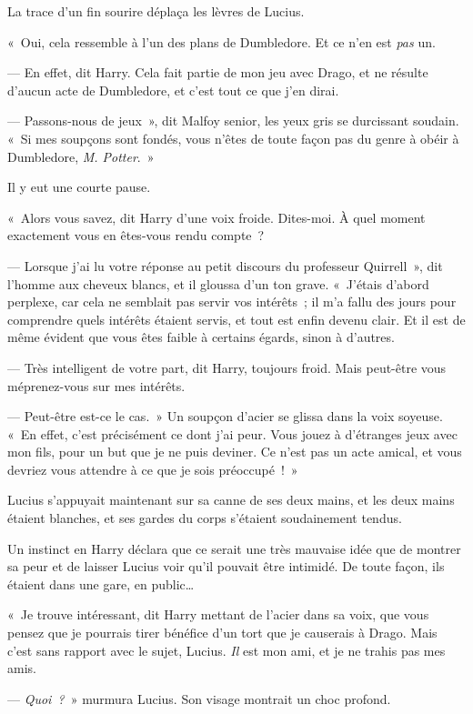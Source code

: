 La trace d'un fin sourire déplaça les lèvres de Lucius.

«~Oui, cela ressemble à l'un des plans de Dumbledore. Et ce n'en est \emph{pas} un.

--- En effet, dit Harry. Cela fait partie de mon jeu avec Drago, et ne résulte d'aucun acte de Dumbledore, et c'est tout ce que j'en dirai.

--- Passons-nous de jeux~», dit Malfoy senior, les yeux gris se durcissant soudain. «~Si mes soupçons sont fondés, vous n'êtes de toute façon pas du genre à obéir à Dumbledore, \emph{M. Potter}.~»

Il y eut une courte pause.

«~Alors vous savez, dit Harry d'une voix froide. Dites-moi. À quel moment exactement vous en êtes-vous rendu compte~?

--- Lorsque j'ai lu votre réponse au petit discours du professeur Quirrell~», dit l'homme aux cheveux blancs, et il gloussa d'un ton grave. «~J'étais d'abord perplexe, car cela ne semblait pas servir vos intérêts~; il m'a fallu des jours pour comprendre quels intérêts étaient servis, et tout est enfin devenu clair. Et il est de même évident que vous êtes faible à certains égards, sinon à d'autres.

--- Très intelligent de votre part, dit Harry, toujours froid. Mais peut-être vous méprenez-vous sur mes intérêts.

--- Peut-être est-ce le cas.~» Un soupçon d'acier se glissa dans la voix soyeuse. «~En effet, c'est précisément ce dont j'ai peur. Vous jouez à d'étranges jeux avec mon fils, pour un but que je ne puis deviner. Ce n'est pas un acte amical, et vous devriez vous attendre à ce que je sois préoccupé~!~»

Lucius s'appuyait maintenant sur sa canne de ses deux mains, et les deux mains étaient blanches, et ses gardes du corps s'étaient soudainement tendus.

Un instinct en Harry déclara que ce serait une très mauvaise idée que de montrer sa peur et de laisser Lucius voir qu'il pouvait être intimidé. De toute façon, ils étaient dans une gare, en public…

«~Je trouve intéressant, dit Harry mettant de l'acier dans sa voix, que vous pensez que je pourrais tirer bénéfice d'un tort que je causerais à Drago. Mais c'est sans rapport avec le sujet, Lucius. \emph{Il} est mon ami, et je ne trahis pas mes amis.

--- \emph{Quoi~?}~» murmura Lucius. Son visage montrait un choc profond.

